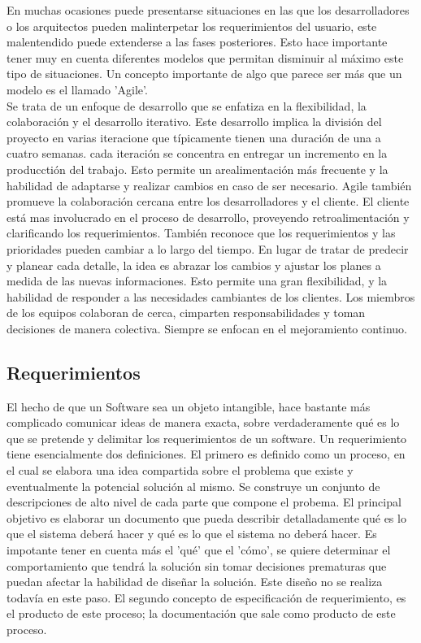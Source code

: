 En muchas ocasiones puede presentarse situaciones en las que los desarrolladores o los arquitectos pueden malinterpetar los requerimientos del usuario, este malentendido puede extenderse a las fases posteriores. Esto hace importante tener muy en cuenta diferentes modelos que permitan disminuir al máximo este tipo de situaciones. Un concepto importante de algo que parece ser más que un modelo es el llamado 'Agile'. \\

Se trata de un enfoque de desarrollo que se enfatiza en la flexibilidad, la colaboración y el desarrollo iterativo. Este desarrollo implica la división del proyecto en varias iteracione que típicamente tienen una duración de una a cuatro semanas. cada iteración se concentra en entregar un incremento en la producctión del trabajo. Esto permite un arealimentación más frecuente y la habilidad de adaptarse y realizar cambios en caso de ser necesario. Agile también promueve la colaboración cercana entre los desarrolladores y el cliente. El cliente está mas involucrado en el proceso de desarrollo, proveyendo retroalimentación y clarificando los requerimientos. También reconoce que los requerimientos y las prioridades pueden cambiar a lo largo del tiempo. En lugar de tratar de predecir y planear cada detalle, la idea es abrazar los cambios y ajustar los planes a medida de las nuevas informaciones. Esto permite una gran flexibilidad, y la habilidad de responder a las necesidades cambiantes de los clientes. Los miembros de los equipos colaboran de cerca, cimparten responsabilidades y toman decisiones de manera colectiva. Siempre se enfocan en el mejoramiento continuo. 

\subsection{Requerimientos}

El hecho de que un Software sea un objeto intangible, hace bastante más complicado comunicar ideas de manera exacta, sobre verdaderamente qué es lo que se pretende y delimitar los requerimientos de un software. Un requerimiento tiene esencialmente dos definiciones. El primero es definido como un proceso, en el cual se elabora una idea compartida sobre el problema que existe y eventualmente la potencial solución al mismo. Se construye un conjunto de descripciones de alto nivel de cada parte que compone el probema. El principal objetivo es elaborar un documento que pueda describir detalladamente qué es lo que el sistema deberá hacer y qué es lo que el sistema no deberá hacer. Es impotante tener en cuenta más el 'qué' que el 'cómo', se quiere determinar el comportamiento que tendrá la solución sin tomar decisiones prematuras que puedan afectar la habilidad de diseñar la solución. Este diseño no se realiza todavía en este paso. El segundo concepto de especificación de requerimiento, es el producto de este proceso; la documentación que sale como producto de este proceso. \\

